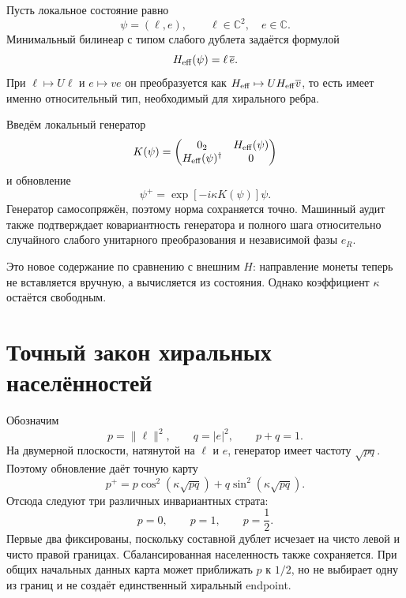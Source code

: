 Пусть локальное состояние равно
\begin{equation}
 \psi=(\ell,e),\qquad \ell\in\mathbb C^2,\quad e\in\mathbb C.
\end{equation}
Минимальный билинеар с типом слабого дублета задаётся формулой
\begin{equation}
 H_{\rm eff}(\psi)=\ell\,\overline e.
 \label{eq:v6-discrete-composite-higgs}
\end{equation}
При $\ell\mapsto U\ell$ и $e\mapsto ve$ он преобразуется как
$H_{\rm eff}\mapsto U H_{\rm eff}\overline v$, то есть имеет именно
относительный тип, необходимый для хирального ребра.

Введём локальный генератор
\begin{equation}
 K(\psi)=
 \begin{pmatrix}
  0_2&H_{\rm eff}(\psi)\\
  H_{\rm eff}(\psi)^\dagger&0
 \end{pmatrix}
 \label{eq:v6-discrete-composite-generator}
\end{equation}
и обновление
\begin{equation}
 \psi^+=\exp[-i\kappa K(\psi)]\psi.
 \label{eq:v6-discrete-composite-update}
\end{equation}
Генератор самосопряжён, поэтому норма сохраняется точно. Машинный аудит
также подтверждает ковариантность генератора и полного шага относительно
случайного слабого унитарного преобразования и независимой фазы $e_R$.

Это новое содержание по сравнению с внешним $H$: направление монеты теперь
не вставляется вручную, а вычисляется из состояния. Однако коэффициент
$\kappa$ остаётся свободным.

\section{Точный закон хиральных населённостей}

Обозначим
\begin{equation}
 p=\|\ell\|^2,\qquad q=|e|^2,\qquad p+q=1.
\end{equation}
На двумерной плоскости, натянутой на $\ell$ и $e$, генератор имеет частоту
$\sqrt{pq}$. Поэтому обновление даёт точную карту
\begin{equation}
 p^+=p\cos^2(\kappa\sqrt{pq})
     +q\sin^2(\kappa\sqrt{pq}).
 \label{eq:v6-discrete-population-map}
\end{equation}
Отсюда следуют три различных инвариантных страта:
\begin{equation}
 p=0,\qquad p=1,\qquad p=\frac12.
\end{equation}
Первые два фиксированы, поскольку составной дублет исчезает на чисто
левой и чисто правой границах. Сбалансированная населенность также
сохраняется. При общих начальных данных карта может приближать $p$ к
$1/2$, но не выбирает одну из границ и не создаёт единственный хиральный
endpoint.

